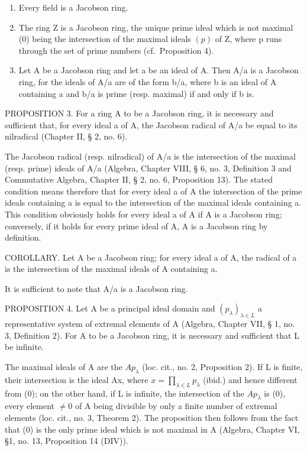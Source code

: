 \begin{enumerate}
\def\labelenumi{(\arabic{enumi})}
\item
  Every field is a Jacobson ring.
\item
  The ring Z is a Jacobson ring, the unique prime ideal which is not maximal (0) being the intersection of the maximal ideals \((p)\) of Z, where p runs through the set of prime numbers (cf.~Proposition 4).
\item
  Let A be a Jacobson ring and let a be an ideal of A. Then A/a is a Jacobson ring, for the ideals of A/a are of the form b/a, where b is an ideal of A containing a and b/a is prime (resp. maximal) if and only if b is.
\end{enumerate}

PROPOSITION 3. For a ring A to be a Jacobson ring, it is necessary and sufficient that, for every ideal a of A, the Jacobson radical of A/a be equal to its nilradical (Chapter II, § 2, no. 6).

The Jacobson radical (resp. nilradical) of A/a is the intersection of the maximal (resp. prime) ideals of A/a (Algebra, Chapter VIII, § 6, no. 3, Definition 3 and Commutative Algebra, Chapter II, § 2, no. 6, Proposition 13). The stated condition means therefore that for every ideal a of A the intersection of the prime ideals containing a is equal to the intersection of the maximal ideals containing a. This condition obviously holds for every ideal a of A if A is a Jacobson ring; conversely, if it holds for every prime ideal of A, A is a Jacobson ring by definition.

COROLLARY. Let A be a Jacobson ring; for every ideal a of A, the radical of a is the intersection of the maximal ideals of A containing a.

It is sufficient to note that A/a is a Jacobson ring.

PROPOSITION 4. Let A be a principal ideal domain and \((p_{\lambda})_{\lambda \in L}\) a representative system of extremal elements of A (Algebra, Chapter VII, § 1, no. 3, Definition 2). For A to be a Jacobson ring, it is necessary and sufficient that L be infinite.

The maximal ideals of A are the \(Ap_{\lambda}\) (loc. cit., no. 2, Proposition 2). If L is finite, their intersection is the ideal Ax, where \(x = \prod_{\lambda \in L} p_{\lambda}\) (ibid.) and hence different from (0); on the other hand, if L is infinite, the intersection of the \(Ap_{\lambda}\) is (0), every element \(\neq 0\) of A being divisible by only a finite number of extremal elements (loc. cit., no. 3, Theorem 2). The proposition then follows from the fact that (0) is the only prime ideal which is not maximal in A (Algebra, Chapter VI, §1, no. 13, Proposition 14 (DIV)).

